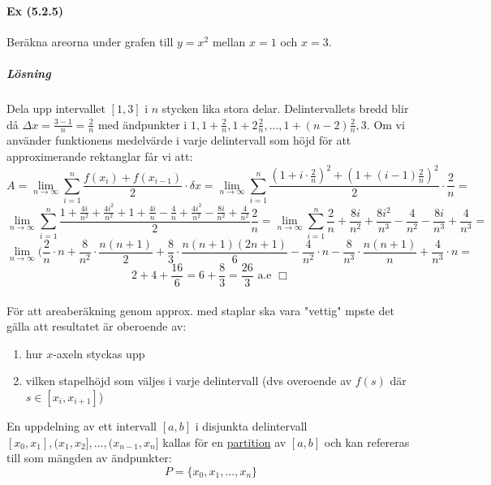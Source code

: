 \paragraph{Ex (5.2.5)} Beräkna areorna under grafen till $y=x^2$ mellan $x=1$ och $x=3$.
\subparagraph*{Lösning}
Dela upp intervallet $[1,3]$ i $n$ stycken lika stora delar.
Delintervallets bredd blir då $\Delta x=\frac{3-1}{n}=\frac{2}{n}$ med ändpunkter i $1,1+\frac{2}{n},1+2\frac{2}{n},...,1+(n-2)\frac{2}{n},3$.
Om vi använder funktionens medelvärde i varje delintervall som höjd för att approximerande rektanglar får vi att:
\begin{equation*}
    A=\lim_{n\to\infty}\sum_{i=1}^n \frac{f(x_i)+f(x_{i-1})}{2}\cdot\delta x=
    \lim_{n\to\infty}\sum_{i=1}^n \frac{(1+i\cdot\frac{2}{n})^2+(1+(i-1)\frac{2}{n})^2}{2}\cdot\frac{2}{n}=
\end{equation*}
\begin{equation*}
    \lim_{n\to\infty}\sum_{i=1}^n\frac{1+\frac{4i}{n^2}+\frac{4i^2}{n^2}+1+\frac{4i}{n}-\frac{4}{n}+\frac{4i^2}{n^2}-\frac{8i}{n^2}+\frac{4}{n^2}}{2}\frac{2}{n}=
    \lim_{n\to\infty}\sum_{i=1}^n\frac{2}{n}+\frac{8i}{n^2}+\frac{8i^2}{n^3}-\frac{4}{n^2}-\frac{8i}{n^3}+\frac{4}{n^3}=
\end{equation*}
\begin{equation*}
    \lim_{n\to\infty}(\frac{2}{n}\cdot n+\frac{8}{n^2}\cdot\frac{n(n+1)}{2}+\frac{8}{3}\cdot\frac{n(n+1)(2n+1)}{6}-\frac{4}{n^2}\cdot n-\frac{8}{n^3}\cdot\frac{n(n+1)}{n}+\frac{4}{n^3}\cdot n=
\end{equation*}
\begin{equation*}
    2+4+\frac{16}{6}=6+\frac{8}{3}=\frac{26}{3}\text{ a.e }\Box
\end{equation*}
~\\
För att areaberäkning genom approx. med staplar ska vara "vettig" mpste det gälla att resultatet är oberoende av:
\begin{enumerate}
    \item hur $x$-axeln styckas upp
    \item vilken stapelhöjd som väljes i varje delintervall (dvs overoende av $f(s)$ där $s\in[x_i,x_{i+1}]$)
\end{enumerate}
En uppdelning av ett intervall $[a,b]$ i disjunkta delintervall $[x_0,x_1],(x_1,x_2],...,(x_{n-1},x_n]$ kallas för en \underline{partition} av $[a,b]$ och kan refereras till som mängden av ändpunkter:
\begin{equation*}
    P=\{x_0,x_1,...,x_n\}
\end{equation*}
